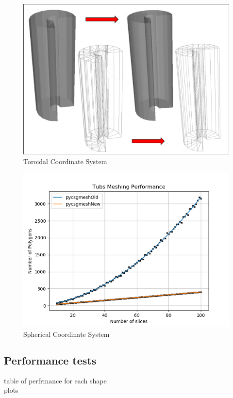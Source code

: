 \documentclass[12pt,a4paper]{article}
\begin{document}
\begin{figure}[h!]
\centering
\includegraphics[scale=0.5]{Images//Meshes//tubs.png}
\caption[width=\columnwidth]{Toroidal Coordinate System}
\label{conts}
\end{figure}

\begin{figure}[h!]
\centering
\includegraphics[scale=0.5]{Images//Quad_fits//Tubs_quad.png}
\caption[width=\columnwidth]{Spherical Coordinate System}
\label{conts}
\end{figure}

\newpage
\subsection{Performance tests}
table of perfrmance for each shape\\
plots\\
\end{document}
